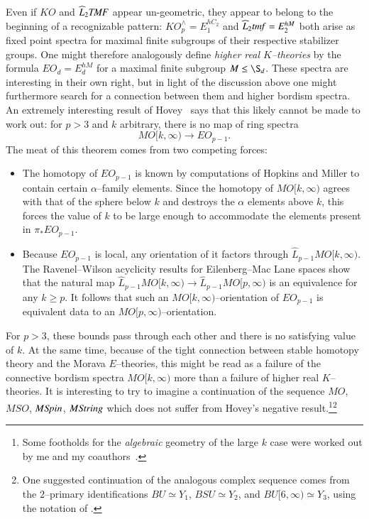 Even if $KO$ and $\widehat L_2 \mathit{TMF}$ appear un-geometric, they appear to belong to the beginning of a recognizable pattern: $KO^\wedge_p = E_1^{hC_2}$ and $\widehat L_2 \mathit{tmf} = E_2^{hM}$ both arise as fixed point spectra for maximal finite subgroups of their respective stabilizer groups.  One might therefore analogously define \textit{higher real $K$--theories} by the formula $EO_d = E_d^{hM}$ for a maximal finite subgroup $M \le \S_d$.  These spectra are interesting in their own right, but in light of the discussion above one might furthermore search for a connection between them and higher bordism spectra.  An extremely interesting result of Hovey~\cite[Proposition 2.3.4]{HoveyVnEltsOfRings} says that this likely cannot be made to work out: for $p > 3$ and $k$ arbitrary, there is no map of ring spectra \[MO[k, \infty) \to EO_{p-1}.\]  The meat of this theorem comes from two competing forces:
\begin{itemize}
    \item The homotopy of $EO_{p-1}$ is known by computations of Hopkins and Miller to contain certain $\alpha$--family elements.  Since the homotopy of $MO[k, \infty)$ agrees with that of the sphere below $k$ and destroys the $\alpha$ elements above $k$, this forces the value of $k$ to be large enough to accommodate the elements present in $\pi_* EO_{p-1}$.
    \item Because $EO_{p-1}$ is local, any orientation of it factors through $\widehat L_{p-1} MO[k, \infty)$.  The Ravenel--Wilson acyclicity results for Eilenberg--Mac Lane spaces show that the natural map $\widehat L_{p-1} MO[k, \infty) \to \widehat L_{p-1} MO[p, \infty)$ is an equivalence for any $k \ge p$.  It follows that such an $MO[k, \infty)$--orientation of $EO_{p-1}$ is equivalent data to an $MO[p, \infty)$--orientation.
\end{itemize}
For $p > 3$, these bounds pass through each other and there is no satisfying value of $k$.  At the same time, because of the tight connection between stable homotopy theory and the Morava $E$--theories, this might be read as a failure of the connective bordism spectra $MO[k, \infty)$ more than a failure of higher real $K$--theories.  It is interesting to try to imagine a continuation of the sequence $MO$, $MSO$, $M\mathit{Spin}$, $M\mathit{String}$ which does not suffer from Hovey's negative result.\footnote{Some footholds for the \emph{algebraic} geometry of the large $k$ case were worked out by me and my coauthors~\cite{HLP}.}\footnote{One suggested continuation of the analogous complex sequence comes from the $2$--primary identifications $BU \simeq Y_1$, $BSU \simeq Y_2$, and $BU[6, \infty) \simeq Y_3$, using the notation of .}









